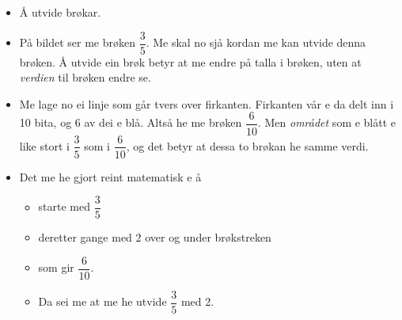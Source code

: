 \documentclass[english,hidelinks,pdftex, 11 pt, class=report,crop=false]{standalone}
\begin{document}
\begin{itemize}
\item  Å utvide brøkar.
\item På bildet ser me brøken $ \dfrac{3}{5} $. Me skal no sjå kordan me kan utvide denna brøken. Å utvide ein brøk betyr at me endre på talla i brøken, uten at \textit{verdien} til brøken endre se.
\item Me lage no ei linje som går tvers over firkanten. Firkanten vår e da delt inn i 10 bita, og 6 av dei e blå. Altså he me brøken $ \dfrac{6}{10} $. Men \textit{området} som e blått e like stort i $ \dfrac{3}{5} $ som i $ \dfrac{6}{10} $, og det betyr at dessa to brøkan he samme verdi.
\item Det me he gjort reint matematisk e å \begin{itemize}
	\item starte med $ \dfrac{3}{5} $
	\item deretter gange med 2 over og under brøkstreken
	\item som gir $ \dfrac{6}{10} $. 
	\item Da sei me at me he utvide $ \dfrac{3}{5} $ med 2.
\end{itemize}
\end{itemize}
\end{document}
